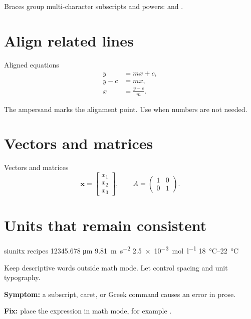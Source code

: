 Braces group multi-character subscripts and powers:
 and .

\section{Align related lines}

\begin{latexcode}{Aligned equations}
\begin{align}
  y &= mx + c, \\
  y - c &= mx, \\
  x &= \frac{y-c}{m}.
\end{align}
\end{latexcode}

The ampersand marks the alignment point. Use  when numbers are not
needed.

\section{Vectors and matrices}

\begin{latexcode}{Vectors and matrices}
\[
  \mathbf{x} =
  \begin{bmatrix}
    x_1 \\
    x_2 \\
    x_3
  \end{bmatrix},
  \qquad
  A =
  \begin{pmatrix}
    1 & 0 \\
    0 & 1
  \end{pmatrix}.
\]
\end{latexcode}

\section{Units that remain consistent}

\begin{latexcode}{siunitx recipes}
\num{12345.678}
\si{\micro\metre}
\qty{9.81}{\metre\per\second\squared}
\qty{2.5e-3}{\mole\per\litre}
\qtyrange{18}{22}{\degreeCelsius}
\end{latexcode}

Keep descriptive words outside math mode. Let  control spacing and
unit typography.

\begin{commonerror}
\textbf{Symptom:} a subscript, caret, or Greek command causes an error in prose.

\textbf{Fix:} place the expression in math mode, for example
.
\end{commonerror}

